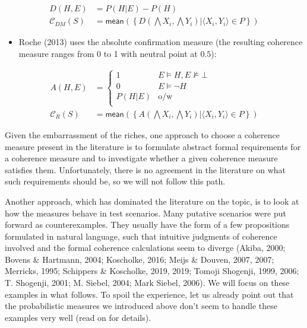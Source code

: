 \documentclass[
  10pt,
]{scrartcl}
\providecommand{\tightlist}{%
  \setlength{\itemsep}{0pt}\setlength{\parskip}{0pt}}
\begin{document}
\begin{align}
    D(H,E) &= P(H|E) - P(H) \nonumber \\
\tag{DM}  
    \mathcal{C}_{DM}(S) & =
\mathsf{mean}\left(\left\{D(\bigwedge X_i, \bigwedge Y_i) | \langle X_i, Y_i\rangle \in P\right\} \right)
\end{align}

\begin{itemize}
\tightlist
\item
  Roche (2013) uses the absolute confirmation measure
  (the resulting coherence measure ranges from 0 to 1 with neutral point at \(0.5\)):
\end{itemize}

\begin{align} \nonumber 
    A(H,E)  & = \begin{cases}
    1 & E\models H, E\not \models \bot \\
    0 & E \models \neg H\\
    P(H|E) & \mbox{o/w} \\
    \end{cases} \\
\tag{Roche}  
    \mathcal{C}_{R}(S) & =
\mathsf{mean}\left(\left\{A(\bigwedge X_i, \bigwedge Y_i) | \langle X_i, Y_i\rangle \in P\right\} \right) 
\end{align}

Given the embarrassment of the riches, one approach to choose a coherence measure present in the literature is to formulate abstract formal requirements for a coherence measure and to investigate whether a given coherence measure satisfies them. Unfortunately, there is no agreement in the literature on what such requirements should be, so we will not follow this path. 

Another approach, which has dominated the literature on the topic, is to look at how the measures behave in test scenarios. Many putative scenarios were put forward as counterexamples. They usually have the form of a few propositions formulated in natural language, such that intuitive judgments of coherence involved and the formal coherence calculations seem to diverge (Akiba, 2000; Bovens \& Hartmann, 2004; Koscholke, 2016; Meijs \& Douven, 2007, 2007; Merricks, 1995; Schippers \& Koscholke, 2019, 2019; Tomoji Shogenji, 1999, 2006; T. Shogenji, 2001; M. Siebel, 2004; Mark Siebel, 2006). We will focus on these examples in what follows. To spoil the experience, let us already point out that the probabilistic measures we introduced above don't seem to handle these examples very well (read on for details).
\end{document}
